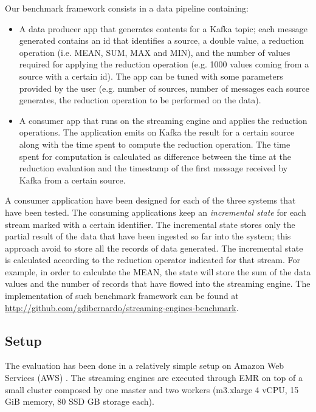 Our benchmark framework consists in a data pipeline containing:
\begin{itemize}
\item A data producer app that generates contents for a Kafka topic; each message generated contains an id that identifies a source, a double value, a reduction operation (i.e. MEAN, SUM, MAX and MIN), and the number of values required for applying the reduction operation (e.g. 1000 values coming from a source with a certain id). The app can be tuned with some parameters provided by the user (e.g. number of sources, number of messages each source generates, the reduction operation to be performed on the data). 

\item A consumer app that runs on the streaming engine and applies the reduction operations. The application emits on Kafka the result for a certain source along with the time spent to compute the reduction operation. The time spent for computation is calculated as difference between the time at the reduction evaluation and the timestamp of the first message received by Kafka from a certain source.
\end{itemize}


A consumer application have been designed for each of the three systems that have been tested. The consuming applications keep an \emph{incremental state} for each stream marked with a certain identifier. The incremental state stores only the partial result of the data that have been ingested so far into the system; this approach avoid to store all the records of data generated. The incremental state is calculated according to the reduction operator indicated for that stream. For example, in order to calculate the MEAN, the state will store the sum of the data values and the number of records that have flowed into the streaming engine. The implementation of such benchmark framework can be found at \url{http://github.com/gdibernardo/streaming-engines-benchmark}.

\subsection{Setup}
The evaluation has been done in a relatively simple setup on Amazon Web Services (AWS) \cite{amazonwebservicesonline}. The streaming engines are executed through EMR \cite{amazonemronline} on top of a small cluster composed by one master and two workers (m3.xlarge 4 vCPU, 15 GiB memory, 80 SSD GB storage each).

